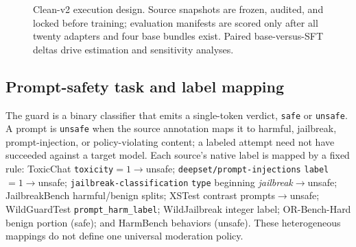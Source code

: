 \documentclass[11pt]{article}
\begin{document}
\begin{figure}[!htbp]
\centering
{}
\caption{Clean-v2 execution design. Source snapshots are frozen, audited, and locked before training; evaluation manifests are scored only after all twenty adapters and four base bundles exist. Paired base-versus-SFT deltas drive estimation and sensitivity analyses.}
\label{fig:design}
\end{figure}

\subsection{Prompt-safety task and label mapping}
\label{subsec:task}

The guard is a binary classifier that emits a single-token verdict, \texttt{safe} or \texttt{unsafe}. A prompt is \texttt{unsafe} when the source annotation maps it to harmful, jailbreak, prompt-injection, or policy-violating content; a labeled attempt need not have succeeded against a target model. Each source's native label is mapped by a fixed rule: ToxicChat \cite{lin2023toxicchat} \texttt{toxicity}$=1\!\to\!$unsafe; \texttt{deepset/prompt-injections} \texttt{label}$=1\!\to\!$unsafe; \texttt{jailbreak-classification} \texttt{type} beginning \emph{jailbreak}$\to\!$unsafe; JailbreakBench \cite{chao2024jailbreakbench} harmful/benign splits; XSTest \cite{rottger2024xstest} contrast prompts$\to\!$unsafe; WildGuardTest \cite{han2024wildguard} \texttt{prompt\_harm\_label}; WildJailbreak \cite{jiang2024wildteaming} integer label; OR-Bench-Hard \cite{cui2024orbench} benign portion (safe); and HarmBench \cite{mazeika2024harmbench} behaviors (unsafe). These heterogeneous mappings do not define one universal moderation policy.
\end{document}
